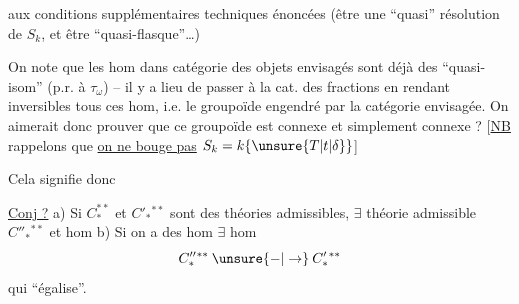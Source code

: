 aux conditions supplémentaires techniques énoncées (être une ``quasi'' résolution de $S_k$, et être ``quasi-flasque''\ldots)

On note que les hom dans   catégorie des objets  envisagés sont déjà des ``quasi-isom'' (p.r. à $\tau_\omega$) -- il y a lieu de passer à la cat. des fractions en  rendant inversibles tous ces hom,  i.e. le groupoïde engendré par la catégorie envisagée. On aimerait donc prouver que ce groupoïde est connexe et simplement connexe ? [\uline{NB} rappelons que  \uline{on ne bouge pas}  $S_k=k\{\unsure{T|t|\delta}\}$]

 Cela signifie donc

\uline{Conj ?} a) Si $C_*^{**}$ et $C'_*{}^{**}$ sont des théories admissibles, $\exists$ théorie admissible $C''_*{}^{**}$ et hom
b) Si on a des hom
$\exists$ hom
\[
 C''_*{}^{**}\mathbin{\unsure{-|\to}}C'_*{}^{**}
\]
qui ``égalise''.
